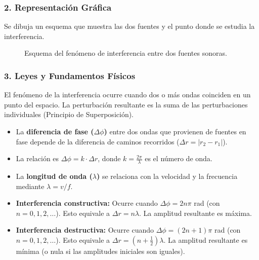 \subsubsection*{2. Representación Gráfica}
Se dibuja un esquema que muestra las dos fuentes y el punto donde se estudia la interferencia.
\begin{figure}[H]
    \centering
    \caption{Esquema del fenómeno de interferencia entre dos fuentes sonoras.}
\end{figure}

\subsubsection*{3. Leyes y Fundamentos Físicos}
El fenómeno de la interferencia ocurre cuando dos o más ondas coinciden en un punto del espacio. La perturbación resultante es la suma de las perturbaciones individuales (Principio de Superposición).
\begin{itemize}
    \item La \textbf{diferencia de fase ($\Delta\phi$)} entre dos ondas que provienen de fuentes en fase depende de la diferencia de caminos recorridos ($\Delta r = |r_2 - r_1|$).
    \item La relación es $\Delta\phi = k \cdot \Delta r$, donde $k = \frac{2\pi}{\lambda}$ es el número de onda.
    \item La \textbf{longitud de onda ($\lambda$)} se relaciona con la velocidad y la frecuencia mediante $\lambda = v/f$.
    \item \textbf{Interferencia constructiva:} Ocurre cuando $\Delta\phi = 2n\pi$ rad (con $n=0, 1, 2, \dots$). Esto equivale a $\Delta r = n\lambda$. La amplitud resultante es máxima.
    \item \textbf{Interferencia destructiva:} Ocurre cuando $\Delta\phi = (2n+1)\pi$ rad (con $n=0, 1, 2, \dots$). Esto equivale a $\Delta r = (n+\frac{1}{2})\lambda$. La amplitud resultante es mínima (o nula si las amplitudes iniciales son iguales).
\end{itemize}


